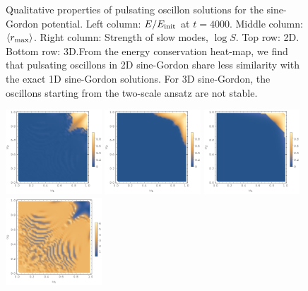 \documentclass[%
reprint,
superscriptaddress,
amsmath,amssymb,
aps,
prd,
floatfix,
nofootinbib
]{revtex4-1}
\begin{document}
\begin{figure}
  \caption{Qualitative properties of pulsating oscillon solutions for the sine-Gordon potential. Left column: $E/E_{\rm init}$ at $t=4000$.
    Middle column: $\langle r_{\rm max}\rangle$.
    Right column: Strength of slow modes, $\log{S}$.\quad
    Top row: 2D. Bottom row: 3D.\qquad From the energy conservation heat-map, we find that pulsating oscillons in 2D sine-Gordon share less similarity with the exact 1D sine-Gordon solutions. For 3D sine-Gordon, the oscillons starting from the two-scale ansatz are not stable.}\label{sine2d3d}
\end{figure}

\begin{figure}
    \centering
    \includegraphics[width=0.32\textwidth]{plot/energy-ratio-phi6-1d.png}
    \includegraphics[width=0.32\textwidth]{plot/energy-ratio-phi6-2d.png}
    \includegraphics[width=0.32\textwidth]{plot/energy-ratio-phi6-3d.png} \\
    \includegraphics[width=0.32\textwidth]{plot/r_max-phi6-1d.png}

\end{figure}
\end{document}
